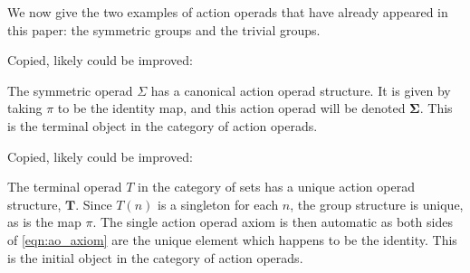 We now give the two examples of action operads that have already appeared in this paper: the symmetric groups and the trivial groups.

\begin{example}\label{example:aop-sym}
Copied, likely could be improved:

The symmetric operad $\Sigma$ has a canonical action operad structure. It is given by taking $\pi$ to be the identity map, and this action operad will be denoted $\mathbf{\Sigma}$. This is the terminal object in the category of action operads.
\end{example}

\begin{example}\label{example:aop-triv}
Copied, likely could be improved:

The terminal operad $T$ in the category of sets has a unique action operad structure, $\mathbf{T}$. Since $T(n)$ is a singleton for each $n$, the group structure is unique, as is the map $\pi$. The single action operad axiom is then automatic as both sides of \cref{eqn:ao_axiom} are the unique element which happens to be the identity. This is the initial object in the category of action operads.
\end{example}

